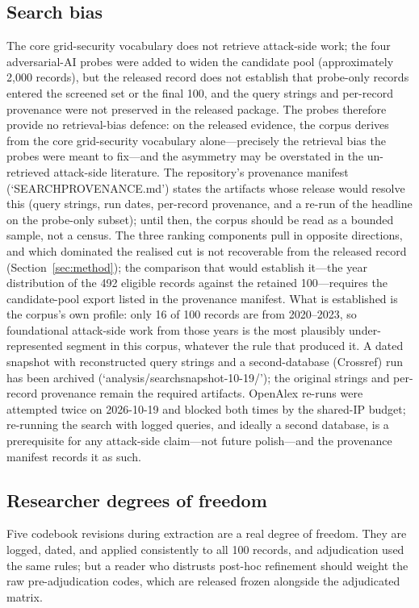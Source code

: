 \documentclass[preprint,12pt]{elsarticle}
\renewcommand{\_}{\plainunderscore\allowbreak}
\begin{document}
\subsection{Search bias}
The core grid-security vocabulary does not retrieve attack-side work; the four adversarial-AI
probes were added to widen the candidate pool (approximately 2,000 records), but the released
record does not establish that probe-only records entered the screened set or the final 100,
and the query strings and per-record provenance were not preserved in the released package.
The probes therefore provide no retrieval-bias defence: on the released evidence, the
corpus derives from the core grid-security vocabulary alone---precisely the retrieval bias
the probes were meant to fix---and the asymmetry may be overstated in the un-retrieved
attack-side literature. The
repository's provenance manifest (`SEARCH\_PROVENANCE.md') states the artifacts whose release
would resolve this (query strings, run dates, per-record provenance, and a re-run of the
headline on the probe-only subset); until then, the corpus should be read as a bounded
sample, not a census. The three ranking components pull in opposite directions, and which
dominated the realised cut is not recoverable from the released record
(Section~\ref{sec:method}); the comparison that would establish it---the year distribution
of the 492 eligible records against the retained 100---requires the candidate-pool export
listed in the provenance manifest. What is established is the corpus's own profile: only
16 of 100 records are from 2020--2023, so foundational attack-side work from those years is
the most plausibly under-represented segment in this corpus, whatever the rule that
produced it. A dated snapshot with reconstructed query strings and a second-database
(Crossref) run has been archived (`analysis/search\_snapshot\_2026-10-19/'); the original
strings and per-record provenance remain the required artifacts. OpenAlex re-runs were
attempted twice on 2026-10-19 and blocked both times by the
shared-IP budget; re-running the search with logged queries, and ideally a second
database, is a prerequisite for any attack-side claim---not future polish---and the
provenance manifest records it as such.

\subsection{Researcher degrees of freedom}
Five codebook revisions during extraction are a real degree of freedom. They are logged, dated,
and applied consistently to all 100 records, and adjudication used the same rules; but a reader
who distrusts post-hoc refinement should weight the raw pre-adjudication codes, which are
released frozen alongside the adjudicated matrix.
\end{document}
